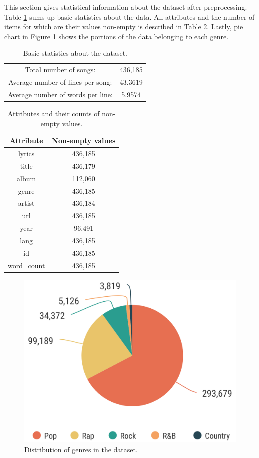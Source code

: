 This section gives statistical information about the dataset after preprocessing. Table \ref{basic_stats} sums up basic statistics about the data. All attributes and the number of items for which are their values non-empty is described in Table \ref{stats_nonempty_values}. Lastly, pie chart in Figure \ref{piechart_genres} shows the portions of the data belonging to each genre. 
\begin{table}[h!]
	\centering
	\begin{tabular}{c c} 
		Total number of songs: & 436,185\\ 
		Average number of lines per song: & 43.3619 \\
		Average number of words per line: & 5.9574 \\
	\end{tabular}
	\caption{Basic statistics about the dataset.}
	\label{basic_stats}
\end{table}

\begin{table}[h!]
	\centering
	\begin{tabular}{| c | c |} 
		\hline
		Attribute & Non-empty values \\ [0.5ex] 
		\hline
		lyrics & 436,185 \\
		title & 436,179 \\
		album & 112,060 \\
		genre & 436,185 \\ 
		artist & 436,184 \\ 
		url & 436,185 \\
		year & 96,491 \\ 
		lang & 436,185 \\
		id & 436,185 \\
		word\_count & 436,185 \\
		\hline
	\end{tabular}
	\caption{Attributes and their counts of non-empty values.}
	\label{stats_nonempty_values}
\end{table}


\begin{figure}[h]\centering
	\includegraphics[scale=0.25]{../img/piechart_genres.png}
	\caption{Distribution of genres in the dataset.}\label{piechart_genres}
\end{figure}



